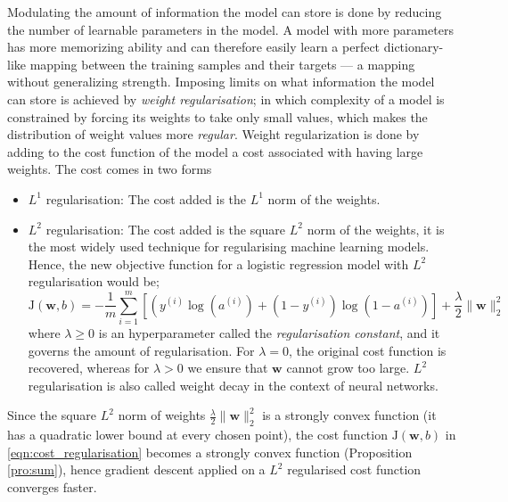 \documentclass[12pt]{report}
\numberwithin{equation}{section}
\begin{document}
Modulating the amount of information the model can store is done by reducing  the number of learnable parameters in the model. A model with more parameters has more memorizing ability and can therefore easily learn a perfect dictionary-like mapping between the training samples and their targets — a mapping without generalizing strength. Imposing limits on what information the model can store is achieved by \textit{weight regularisation}; in which complexity of a model is constrained by forcing its weights to take only small values, which makes the distribution of weight values more \textit{regular}. Weight regularization is done by adding to the cost function of the model a cost associated with having large weights. The cost comes in two forms
\begin{itemize}
\item $L^1$ regularisation: The cost added is the $L^1$ norm of the weights.
\item $L^2$ regularisation: The cost added is the square $L^2$ norm of the weights, it is the most widely used technique for regularising machine learning models. Hence, the new objective function for a logistic regression model with $L^2$ regularisation would be;
\begin{equation}\label{eqn:cost_regularisation}
\mathrm{J}(\bm{w}, b) =-\frac{1}{m} \sum_{i=1}^{m}\left[\left(y^{(i)} \log \left(a^{(i)}\right)+\left(1-y^{(i)}\right) \log \left(1-a^{(i)}\right)\right]\right. + \frac{\lambda}{2}\|\bm{w}\|_2^2
\end{equation}
where $\lambda\geq 0$ is an hyperparameter called the \textit{regularisation constant}, and it governs the amount of regularisation. For $\lambda = 0$, the  original cost function is recovered, whereas for $\lambda > 0$ we ensure that $\bm{w}$ cannot grow too large. $L^2$ regularisation is also called weight decay in the context of neural networks. 
\end{itemize}
Since the square $L^2$ norm of weights $\frac{\lambda}{2}\|\bm{w}\|_2^2$ is a strongly convex function (it has a quadratic lower bound at every chosen point), the cost function $\mathrm{J}(\bm{w}, b)$ in \eqref{eqn:cost_regularisation} becomes a strongly convex function (Proposition \ref{pro:sum}), hence gradient descent applied on a $L^2$ regularised cost function converges faster.
\end{document}
